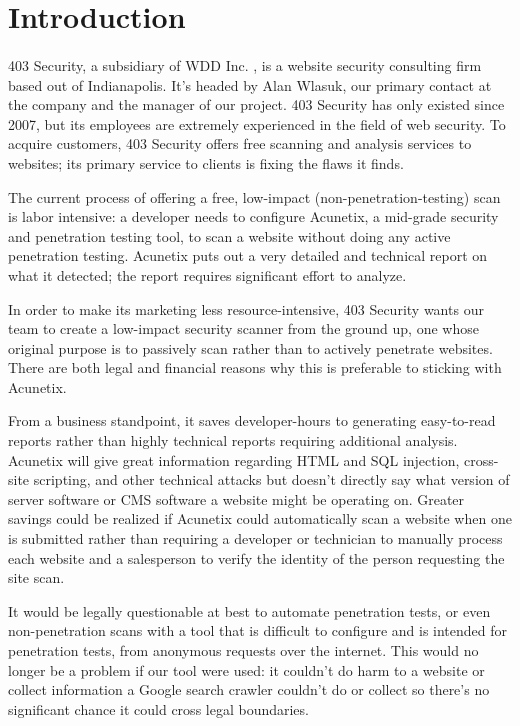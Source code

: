\section{Introduction}

\paragraph{}403 Security, a subsidiary of WDD Inc. , is a website security consulting firm based out of Indianapolis.  It’s headed by Alan Wlasuk, our primary contact at the company and the manager of our project. 403 Security has only existed  since 2007, but its employees are extremely experienced in the field of web security. To acquire customers, 403 Security offers free scanning and analysis services to websites; its primary service to clients is fixing the flaws it finds.

The current process of offering a free, low-impact (non-penetration-testing) scan is labor intensive: a developer needs to configure Acunetix, a mid-grade security and penetration testing tool, to scan a website without doing any active penetration testing. Acunetix puts out a very detailed and technical report on what it detected; the report requires significant effort to analyze.

In order to make its marketing less resource-intensive, 403 Security wants our team to create a low-impact security scanner from the ground up, one whose original purpose is to passively scan rather than to actively penetrate websites. There are both legal and financial reasons why this is preferable to sticking with Acunetix.

From a business standpoint, it saves developer-hours to  generating easy-to-read reports rather than highly technical reports requiring additional analysis. Acunetix will give great information regarding HTML and SQL injection, cross-site scripting, and other technical attacks but doesn’t directly say what version of server software or CMS software a website might be operating on. Greater savings could be realized if Acunetix could automatically scan a website when one is submitted rather than requiring a developer or technician to manually process each website and a salesperson to verify the identity of the person requesting the site scan.

It would be legally questionable at best to automate penetration tests, or even non-penetration scans with a tool that is difficult to configure and is intended for penetration tests, from anonymous requests over the internet. This would no longer be a problem if our tool were used: it couldn’t do harm to a website or collect information a Google search crawler couldn’t do or collect so there’s no significant chance it could cross legal boundaries.
